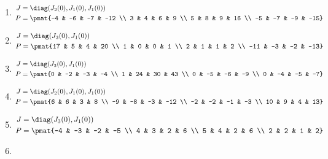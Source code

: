 \begin{enumerate}
\item

\begin{align*}
J &= \diag(J_{2}(0), J_{1}(0), J_{1}(0))\\
P &= \pmat{-4 & -6 & -7 & -12 \\ 3 & 4 & 6 & 9 \\ 5 & 8 & 9 & 16 \\ -5 & -7 & -9 & -15}
\end{align*}

\item

\begin{align*}
J &= \diag(J_{3}(0), J_{1}(0))\\
P &= \pmat{17 & 5 & 4 & 20 \\ 1 & 0 & 0 & 1 \\ 2 & 1 & 1 & 2 \\ -11 & -3 & -2 & -13}
\end{align*}

\item

\begin{align*}
J &= \diag(J_{3}(0), J_{1}(0))\\
P &= \pmat{0 & -2 & -3 & -4 \\ 1 & 24 & 30 & 43 \\ 0 & -5 & -6 & -9 \\ 0 & -4 & -5 & -7}
\end{align*}

\item

\begin{align*}
J &= \diag(J_{2}(0), J_{1}(0), J_{1}(0))\\
P &= \pmat{6 & 6 & 3 & 8 \\ -9 & -8 & -3 & -12 \\ -2 & -2 & -1 & -3 \\ 10 & 9 & 4 & 13}
\end{align*}

\item

\begin{align*}
J &= \diag(J_{3}(0), J_{1}(0))\\
P &= \pmat{-4 & -3 & -2 & -5 \\ 4 & 3 & 2 & 6 \\ 5 & 4 & 2 & 6 \\ 2 & 2 & 1 & 2}
\end{align*}

\item


\end{enumerate}
